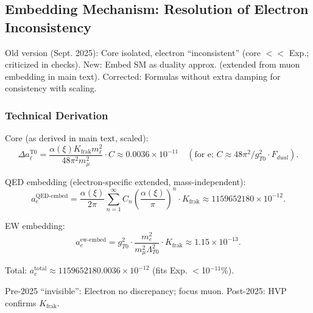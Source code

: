 \documentclass[12pt,a4paper]{article}
\theoremstyle{definition}
\begin{document}
	\subsection{Embedding Mechanism: Resolution of Electron Inconsistency}
	
	Old version (Sept. 2025): Core isolated, electron ``inconsistent'' (core $<<$ Exp.; criticized in checks). New: Embed SM as duality approx. (extended from muon embedding in main text). Corrected: Formulas without extra damping for consistency with scaling.
	
	\subsubsection{Technical Derivation}
	
	Core (as derived in main text, scaled):
	\begin{equation}
		\Delta a_\ell^\text{T0} = \frac{\alpha(\xi) K_{\text{frak}} m_\ell^2}{48 \pi^2 m_\mu^2} \cdot C \approx 0.0036 \times 10^{-11} \quad (\text{for e; } C \approx 48 \pi^2 / g_{T0}^2 \cdot F_{dual}).
	\end{equation}
	
	QED embedding (electron-specific extended, mass-independent):
	\begin{equation}
		a_e^\text{QED-embed} = \frac{\alpha(\xi)}{2\pi} \sum_{n=1}^\infty C_n \left( \frac{\alpha(\xi)}{\pi} \right)^n \cdot K_{\text{frak}} \approx 1159652180 \times 10^{-12}.
	\end{equation}
	
	EW embedding:
	\begin{equation}
		a_e^\text{ew-embed} = g_{T0}^2 \cdot \frac{m_e^2}{m_\mu^2 \Lambda_{T0}^2} \cdot K_{\text{frak}} \approx 1.15 \times 10^{-13}.
	\end{equation}
	
	Total: $a_e^\text{total} \approx 1159652180.0036 \times 10^{-12}$ (fits Exp. $<$10$^{-11}$\%).
	
	Pre-2025 ``invisible'': Electron no discrepancy; focus muon. Post-2025: HVP confirms $K_\text{frak}$.
	
\end{document}
